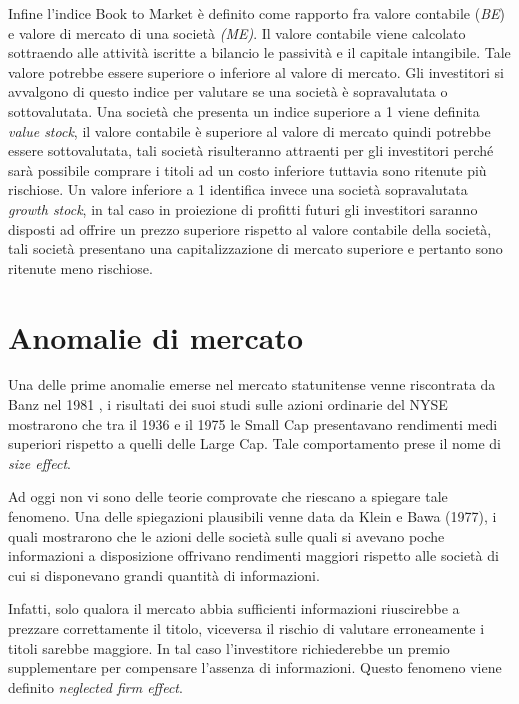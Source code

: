 Infine l'indice Book to Market è definito come rapporto fra valore contabile (\textit{BE}) e valore di mercato di una società \textit{(ME)}. Il valore contabile viene calcolato sottraendo alle attività iscritte a bilancio le passività e il capitale intangibile. Tale valore potrebbe essere superiore o inferiore al valore di mercato. Gli investitori si avvalgono di questo indice per valutare se una società è sopravalutata o sottovalutata. Una società che presenta un indice superiore a 1 viene definita \textit{value stock}, il valore contabile è superiore al valore di mercato quindi potrebbe essere sottovalutata, tali società risulteranno attraenti per gli investitori perché sarà possibile comprare i titoli ad un costo inferiore tuttavia sono ritenute più rischiose. Un valore inferiore a 1 identifica invece una società sopravalutata \textit{growth stock}, in tal caso in proiezione di profitti futuri gli investitori saranno disposti ad offrire un prezzo superiore rispetto al valore contabile della società, tali società presentano una capitalizzazione di mercato superiore e pertanto sono ritenute meno rischiose.

\section{Anomalie di mercato}

Una delle prime anomalie emerse nel mercato statunitense venne riscontrata da Banz nel 1981 \cite{banz_relationship_1981}, i risultati dei suoi studi sulle azioni ordinarie del NYSE mostrarono che tra il 1936 e il 1975 le Small Cap presentavano rendimenti medi superiori rispetto a quelli delle Large Cap. Tale comportamento prese il nome di \textit{size effect}. 

Ad oggi non vi sono delle teorie comprovate che riescano a spiegare tale fenomeno. Una delle spiegazioni plausibili venne data da Klein e Bawa (1977), i quali mostrarono che le azioni delle società sulle quali si avevano poche informazioni a disposizione offrivano rendimenti maggiori rispetto alle società di cui si disponevano grandi quantità di informazioni. 

Infatti, solo qualora il mercato abbia sufficienti informazioni riuscirebbe a prezzare correttamente il titolo, viceversa il rischio di valutare erroneamente i titoli sarebbe maggiore. In tal caso l'investitore richiederebbe un premio supplementare per compensare l’assenza di informazioni. Questo fenomeno viene definito \textit{neglected firm effect}. 

